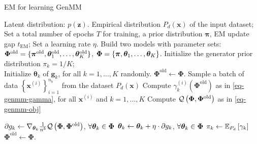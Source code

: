\begin{algorithm}[t]
  \caption{EM for learning GenMM}\label{flow-algo-em}
  \begin{algorithmic}[1]
    Latent distribution: $p(\bm{z})$. Empirical distribution $P_d(\bm{x})$ of the input dataset;
    \STATE Set a total number of epochs $T$ for training, a prior distribution $\bm{\pi}$, EM update gap $t_{\mathrm{EM}}$;
    \STATE  Set a learning rate $\eta$. 
    \STATE Build two models with parameter sets:
    \STATE ${\bm{\Phi}}^{\mathrm{old}}=\{ \bm{\pi}^{\mathrm{old}},
    \bm{\theta}_1^{\mathrm{old}},\hdots,
    \bm{\theta}_K^{\mathrm{old}} \}$,
    \STATE ${\bm{\Phi}} = \{ \bm{\pi},
    \bm{\theta}_1,\hdots, \bm{\theta}_K \}$.
    \STATE Initialize the generator prior distribution $\pi_k = 1/K$;\\ Initialize $\bm{\theta}_k$ of $\bm{g}_k$, for all $k=1,\dots,K$ randomly. 
    \STATE $\bm{\Phi}^{\mathrm{old}} \gets \bm{\Phi}$.
    \STATE Sample a batch of data $\left\{ \bm{x}^{(i)}
    \right\}_{i=1}^{n_b}$ from the dataset $P_d(\bm{x})$
    \STATE Compute $\gamma_k^{(i)}(\bm{\Phi}^{\mathrm{old}})$ as in \autoref{eq-genmm-gamma},
    for all $\bm{x}^{(i)}$ and $k=1, \dots, K$
    \STATE Compute
    $\mathcal{Q}\left(\bm{\Phi},\bm{\Phi}^{\mathrm{old}}\right)$ as in \autoref{eq-genmm-obj}%
    
    \STATE $\partial{g_k} \gets \nabla_{\bm{\theta}_k} \frac{1}{n^{b}}\mathcal{Q}\left(
      \bm{\Phi}, \bm{\Phi}^{\mathrm{old}}\right)$,
    $\forall \bm{\theta}_k \in \bm{\Phi}$
    \STATE $\bm{\theta}_k \gets \bm{\theta}_k + \eta \cdot \partial{g_k}$, $\forall \bm{\theta}_k \in \bm{\Phi}$
    \ENDFOR
    \STATE $\pi_k \gets \mathbb{E}_{P_d}\left[ \gamma_k \right]$ %
    \STATE $\bm{\Phi}^{\mathrm{old}} \gets \bm{\Phi}$.
    \ENDIF
    \ENDFOR
  \end{algorithmic}
\end{algorithm}

